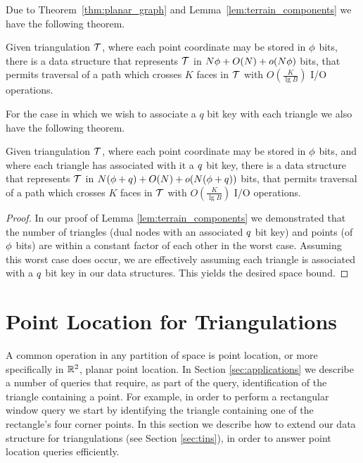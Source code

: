{Due to Theorem~\ref{thm:planar_graph} and Lemma~\ref{lem:terrain_components} we
have the following theorem.

\begin{theorem}\label{thm:terrain_traversal}
Given triangulation $\mathcal{T}$, where each point coordinate may be stored in 
$\phi$ bits, there is a data structure that represents $\mathcal{T}$ in 
$N\phi + O(N) +o(N\phi)$ bits, that permits traversal of a path 
which crosses $K$ faces in $\mathcal{T}$ with 
$O \left( \frac{K}{ \lg{B} } \right)$ I/O operations.
\end{theorem} 

For the case in which we wish to associate a $q$ bit key with each 
triangle we also have the following theorem.

\begin{theorem}\label{thm:terrain_keys_traversal}
Given triangulation $\mathcal{T}$, where each point coordinate may be stored 
in $\phi$ bits, and where each triangle has associated with it a 
$q$ bit key, there is a data structure that represents 
$\mathcal{T}$ in 
$N(\phi + q) + O(N) + o(N(\phi + q))$ bits, that 
permits traversal of a path which crosses $K$ faces in $\mathcal{T}$ 
with $O \left( \frac{K}{ \lg{B} } \right)$ I/O operations.
\end{theorem}

\begin{proof}
In our proof of Lemma \ref{lem:terrain_components} we demonstrated 
that the number of triangles (dual nodes with an associated $q$ 
bit key) and points (of $\phi$ bits) are within a constant factor 
of each other in the worst case. 
Assuming this worst case does occur, we are effectively assuming each 
triangle is associated with a $q$ bit key in our data structures. 
This yields the desired space bound.
\end{proof}




\section{Point Location for Triangulations}\label{sec:point_location}


A common operation in any partition of space is point location, or more
specifically in $\mathbb{R}^2$, planar point location.
In Section \ref{sec:applications} we describe a number of queries
that require, as part of the query, identification of the triangle 
containing a point. 
For example, in order to perform a rectangular window query we start by
identifying the triangle containing one of the rectangle's four
corner points.
In this section we describe how to extend our data structure
for triangulations (see Section \ref{sec:tins}), in order to answer point 
location queries efficiently.

}
